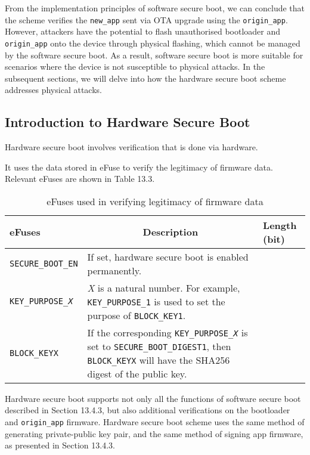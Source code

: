 \documentclass[a4paper,12pt]{book}
\begin{document}
From the implementation principles of software secure boot, we can conclude that the scheme verifies the \verb|new_app| sent via OTA upgrade using the \verb|origin_app|. However, attackers have the potential to flash unauthorised bootloader and \verb|origin_app| onto the device through physical flashing, which cannot be managed by the software secure boot. As a result, software secure boot is more suitable for scenarios where the device is not susceptible to physical attacks. In the subsequent sections, we will delve into how the hardware secure boot scheme addresses physical attacks.

\subsection{Introduction to Hardware Secure Boot}
Hardware secure boot involves verification that is done via hardware.

It uses the data stored in eFuse to verify the legitimacy of firmware data. Relevant eFuses are shown in Table 13.3.

\begin{table}[h!]
    \renewcommand{\arraystretch}{1.4}
    \caption{eFuses used in verifying legitimacy of firmware data}
    \begin{tabular}{|>{\Centering}m{9em}|m{23.5em}|>{\Centering}m{6em}|}
        \hline
        \rowcolor{LightBlue} \textbf{eFuses}&\multicolumn{1}{c|}{\textbf{Description}}&\textbf{Length (bit)}\\
        \hline
        \verb|SECURE_BOOT_EN|&If set, hardware secure boot is enabled permanently.&1\\
        \hline
        \texttt{KEY\_PURPOSE\_\textit{X}}&\textit{X} is a natural number. For example, \verb|KEY_PURPOSE_1| is used to set the purpose of \verb|BLOCK_KEY1|.&4\\
        \hline
        \verb|BLOCK_KEYX|&If the corresponding \texttt{KEY\_PURPOSE\_\textit{X}} is set to \verb|SECURE_BOOT_DIGEST1|, then \verb|BLOCK_KEYX| will have the SHA256 digest of the public key.&256\\
        \hline
    \end{tabular}
\end{table}

Hardware secure boot supports not only all the functions of software secure boot described in Section 13.4.3, but also additional verifications on the bootloader and \verb|origin_app| firmware. Hardware secure boot scheme uses the same method of generating private-public key pair, and the same method of signing app firmware, as presented in Section 13.4.3.
\end{document}
